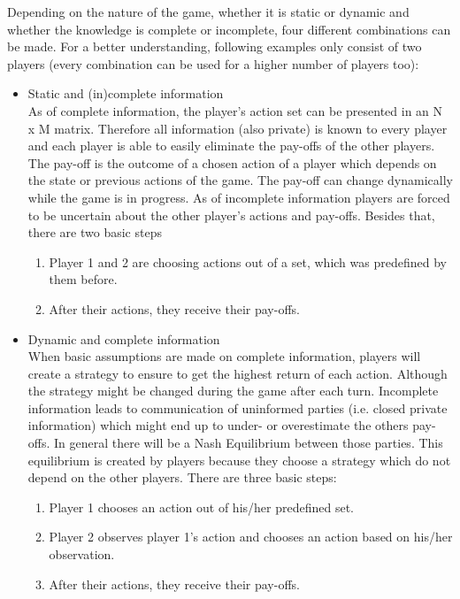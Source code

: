 Depending on the nature of the game, whether it is static or dynamic and whether the knowledge is complete or incomplete, four different combinations can be made.
For a better understanding, following examples only consist of two players (every combination can be used for a higher number of players too):

\begin{itemize}
	\item Static and (in)complete information\\
	As of complete information, the player's action set can be presented in an N x M matrix.
	Therefore all information (also private) is known to every player and each player is able to easily eliminate the pay-offs of the 		
	other players. The pay-off is the outcome of a chosen action of a player which depends on the state or previous actions of 
	the game. The pay-off can change dynamically while the game is in progress.
	As of incomplete information players are forced to be uncertain about the other player's actions and pay-offs.
	Besides that, there are two basic steps
	\begin{enumerate}
		\item Player 1 and 2 are choosing actions out of a set, which was predefined by them before.
		\item After their actions, they receive their pay-offs.
	\end{enumerate}
	\item Dynamic and complete information\\
	When basic assumptions are made on complete information, players will create a strategy to ensure to get the highest return of each action. 
	Although the strategy might be changed during the game after each turn.
	Incomplete information leads to communication of uninformed parties (i.e. closed private information) which might end up to under- or overestimate the others pay-offs. 
	In general there will be a Nash Equilibrium between those parties. 
	This equilibrium is created by players because they choose a strategy which do not depend on the other players. 
	There are three basic steps: 
	\begin{enumerate}
		\item Player 1 chooses an action out of his/her predefined set.
		\item Player 2 observes player 1's action and chooses an action based on his/her observation.
		\item After their actions, they receive their pay-offs.
	\end{enumerate}
\end{itemize}

